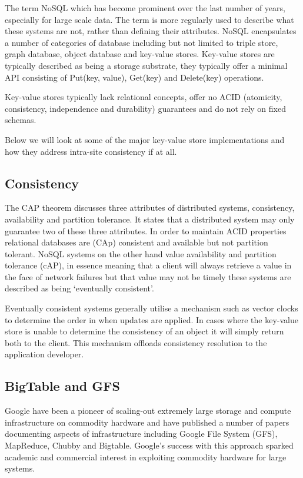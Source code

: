 The term NoSQL which has become prominent over the last number of years, especially for large scale data. The term is more regularly used to describe what these systems are not, rather than defining their attributes. NoSQL encapsulates a number of categories of database including but not limited to triple store, graph database, object database and key-value stores. Key-value stores are typically described as being a storage substrate, they typically offer a minimal API consisting of Put(key, value), Get(key) and Delete(key) operations.

Key-value stores typically lack relational concepts, offer no ACID\cite{acid} (atomicity, consistency, independence and durability) guarantees and do not rely on fixed schemas.  

Below we will look at some of the major key-value store implementations and how they address intra-site consistency if at all.

\subsection{Consistency}
The CAP theorem\cite{cap} discusses three attributes of distributed systems, consistency, availability and partition tolerance. It states that a distributed system may only guarantee two of these three attributes. In order to maintain ACID properties relational databases are (CAp) consistent and available but not partition tolerant. NoSQL systems on the other hand value availability and partition tolerance (cAP), in essence meaning that a client will always retrieve a value in the face of network failures but that value may not be timely these systems are described as being `eventually consistent'.

Eventually consistent systems generally utilise a mechanism such as vector clocks to determine the order in when updates are applied. In cases where the key-value store is unable to determine the consistency of an object it will simply return both to the client. This mechanism offloads consistency resolution to the application developer. 	


\subsection{BigTable and GFS}
Google have been a pioneer of scaling-out extremely large storage and compute infrastructure on commodity hardware and have published a number of papers documenting aspects of infrastructure including Google File System (GFS)\cite{googFS}, MapReduce\cite{googMapReduce}, Chubby\cite{googChubby} and Bigtable\cite{googBigTable}. Google's success with this approach sparked academic and commercial interest in exploiting commodity hardware for large systems. 

